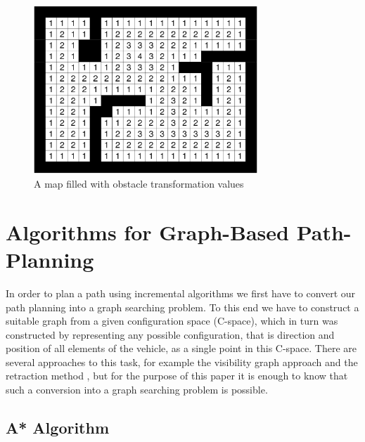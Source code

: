 \begin{figure}[b]
\centering
\includegraphics[width=0.75\textwidth]{./Chapters/Figures/obstacle_transformation.png}
\caption{A map filled with obstacle transformation values\label{pic:obstacle_transformation}}
\end{figure}

\section{Algorithms for Graph-Based Path-Planning}
\label{sec:graphbased_pathplanning}

In order to plan a path using incremental algorithms we first have to convert our path planning into a graph searching problem. To this end we have to construct a suitable graph from a given configuration space (C-space), which in turn was constructed by representing any possible configuration, that is direction and position of all elements of the vehicle, as a single point in this C-space. There are several approaches to this task, for example the visibility graph approach \cite{2,3} and the retraction method \cite{4,5}, but for the purpose of this paper it is enough to know that such a conversion into a graph searching problem is possible. 

\subsection{A* Algorithm}
\label{sec:a_star}

